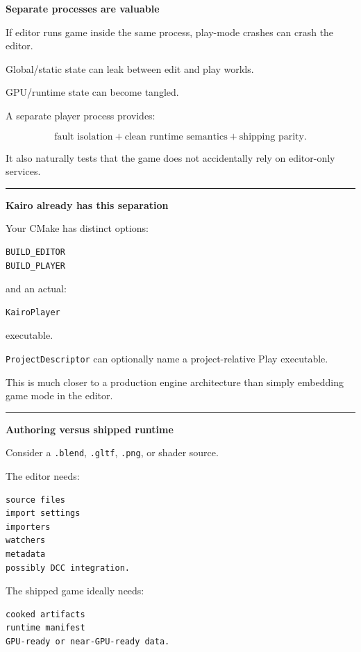 \textbf{Separate processes are valuable}

If editor runs game inside the same process, play-mode crashes can crash the editor.

Global/static state can leak between edit and play worlds.

GPU/runtime state can become tangled.

A separate player process provides:

\[
\boxed{
\text{fault isolation}
+
\text{clean runtime semantics}
+
\text{shipping parity}.
}
\]

It also naturally tests that the game does not accidentally rely on editor-only services.

\begin{center}\rule{0.5\linewidth}{0.5pt}\end{center}

\textbf{Kairo already has this separation}

Your CMake has distinct options:

\begin{verbatim}
BUILD_EDITOR
BUILD_PLAYER
\end{verbatim}

and an actual:

\begin{verbatim}
KairoPlayer
\end{verbatim}

executable.

\texttt{ProjectDescriptor} can optionally name a project-relative Play executable.

This is much closer to a production engine architecture than simply embedding game mode in the editor.

\begin{center}\rule{0.5\linewidth}{0.5pt}\end{center}

\textbf{Authoring versus shipped runtime}

Consider a \texttt{.blend}, \texttt{.gltf}, \texttt{.png}, or shader source.

The editor needs:

\begin{verbatim}
source files
import settings
importers
watchers
metadata
possibly DCC integration.
\end{verbatim}

The shipped game ideally needs:

\begin{verbatim}
cooked artifacts
runtime manifest
GPU-ready or near-GPU-ready data.
\end{verbatim}

